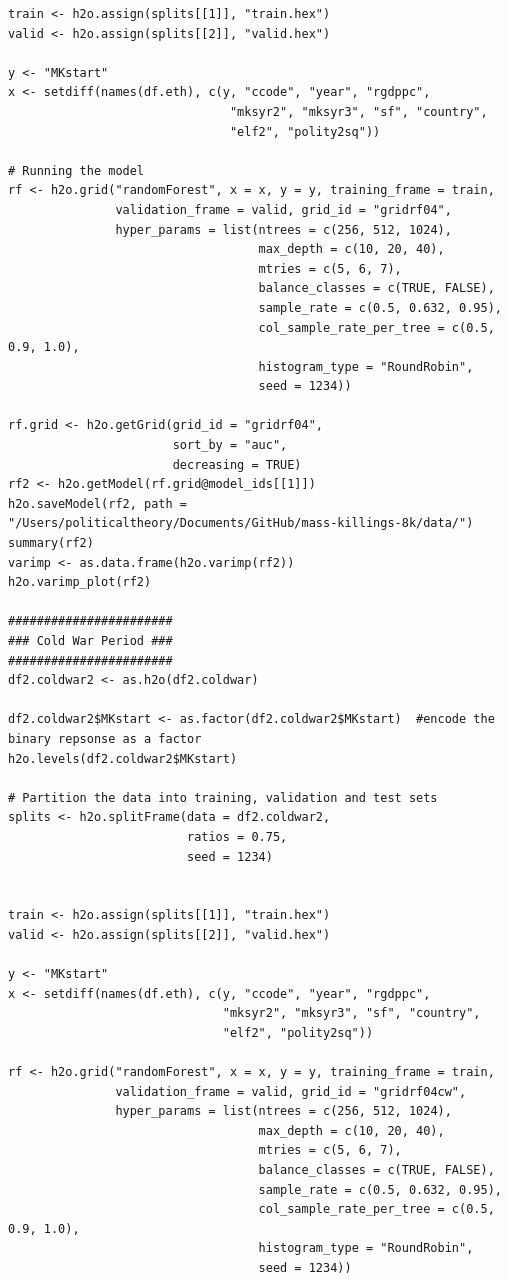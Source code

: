 \begin{verbatim}
train <- h2o.assign(splits[[1]], "train.hex")   
valid <- h2o.assign(splits[[2]], "valid.hex") 

y <- "MKstart"
x <- setdiff(names(df.eth), c(y, "ccode", "year", "rgdppc",
                               "mksyr2", "mksyr3", "sf", "country",
                               "elf2", "polity2sq")) 

# Running the model
rf <- h2o.grid("randomForest", x = x, y = y, training_frame = train, 
               validation_frame = valid, grid_id = "gridrf04",
               hyper_params = list(ntrees = c(256, 512, 1024),
                                   max_depth = c(10, 20, 40),
                                   mtries = c(5, 6, 7),
                                   balance_classes = c(TRUE, FALSE),
                                   sample_rate = c(0.5, 0.632, 0.95),
                                   col_sample_rate_per_tree = c(0.5, 0.9, 1.0),
                                   histogram_type = "RoundRobin",
                                   seed = 1234)) 

rf.grid <- h2o.getGrid(grid_id = "gridrf04",
                       sort_by = "auc",
                       decreasing = TRUE)
rf2 <- h2o.getModel(rf.grid@model_ids[[1]])
h2o.saveModel(rf2, path = "/Users/politicaltheory/Documents/GitHub/mass-killings-8k/data/")
summary(rf2)
varimp <- as.data.frame(h2o.varimp(rf2))
h2o.varimp_plot(rf2)

#######################
### Cold War Period ###
#######################
df2.coldwar2 <- as.h2o(df2.coldwar)

df2.coldwar2$MKstart <- as.factor(df2.coldwar2$MKstart)  #encode the binary repsonse as a factor
h2o.levels(df2.coldwar2$MKstart)

# Partition the data into training, validation and test sets
splits <- h2o.splitFrame(data = df2.coldwar2, 
                         ratios = 0.75,  
                         seed = 1234)  


train <- h2o.assign(splits[[1]], "train.hex")   
valid <- h2o.assign(splits[[2]], "valid.hex") 

y <- "MKstart"
x <- setdiff(names(df.eth), c(y, "ccode", "year", "rgdppc",
                              "mksyr2", "mksyr3", "sf", "country",
                              "elf2", "polity2sq")) 

rf <- h2o.grid("randomForest", x = x, y = y, training_frame = train, 
               validation_frame = valid, grid_id = "gridrf04cw",
               hyper_params = list(ntrees = c(256, 512, 1024),
                                   max_depth = c(10, 20, 40),
                                   mtries = c(5, 6, 7),
                                   balance_classes = c(TRUE, FALSE),
                                   sample_rate = c(0.5, 0.632, 0.95),
                                   col_sample_rate_per_tree = c(0.5, 0.9, 1.0),
                                   histogram_type = "RoundRobin",
                                   seed = 1234)) 


\end{verbatim}
